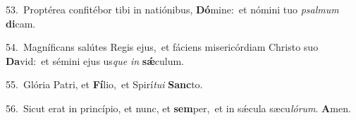 {\numbfont\textcolor{\numbcolor}{53.}}~Proptérea confitébor tibi in natiónibus, \textbf{Dó}\-mine:~\star et nómini tuo \textit{psal}\-\textit{mum} \textbf{di}\-cam.\par
{\numbfont\textcolor{\numbcolor}{54.}}~Magníficans salútes Regis ejus,~\dagger et fáciens misericórdiam Christo suo \textbf{Da}\-vid:~\star et sémini ejus us\textit{que} \textit{in} \textbf{sǽ}\-culum.\par
{\numbfont\textcolor{\numbcolor}{55.}}~Glória Patri, et \textbf{Fí}\-lio,~\star et Spirí\-\textit{tu}\-\textit{i} \textbf{Sanc}\-to.\par
{\numbfont\textcolor{\numbcolor}{56.}}~Sicut erat in princípio, et nunc, et \textbf{sem}\-per,~\star et in sǽcula sæcu\-\textit{ló}\-\textit{rum}. \textbf{A}\-men.\par
